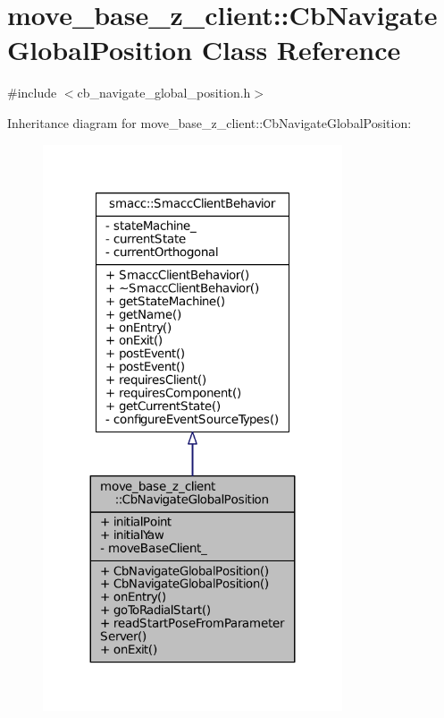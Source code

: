 \hypertarget{classmove__base__z__client_1_1CbNavigateGlobalPosition}{}\section{move\+\_\+base\+\_\+z\+\_\+client\+:\+:Cb\+Navigate\+Global\+Position Class Reference}
\label{classmove__base__z__client_1_1CbNavigateGlobalPosition}


{\ttfamily \#include $<$cb\+\_\+navigate\+\_\+global\+\_\+position.\+h$>$}



Inheritance diagram for move\+\_\+base\+\_\+z\+\_\+client\+:\+:Cb\+Navigate\+Global\+Position\+:
\nopagebreak
\begin{figure}[H]
\begin{center}
\leavevmode
\includegraphics[width=251pt]{classmove__base__z__client_1_1CbNavigateGlobalPosition__inherit__graph}
\end{center}
\end{figure}


